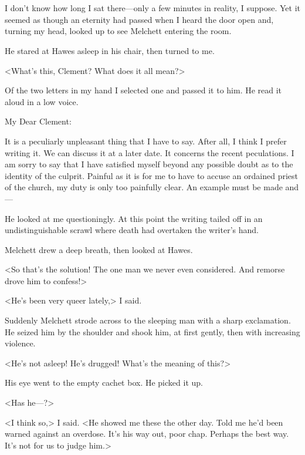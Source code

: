 \chapter[Chapter  \thechapter]{}


\lettrine{I}{} don't know how long I sat there—only a few minutes in reality, I suppose. Yet it seemed as though an eternity had passed when I heard the door open and, turning my head, looked up to see Melchett entering the room.

He stared at Hawes asleep in his chair, then turned to me.

<What's this, Clement? What does it all mean?>

Of the two letters in my hand I selected one and passed it to him. He read it aloud in a low voice.

\begin{mail}{}{My Dear Clement:}

It is a peculiarly unpleasant thing that I have to say. After all, I think I prefer writing it. We can discuss it at a later date. It concerns the recent peculations. I am sorry to say that I have satisfied myself beyond any possible doubt as to the identity of the culprit. Painful as it is for me to have to accuse an ordained priest of the church, my duty is only too painfully clear. An example must be made and—
\end{mail}

He looked at me questioningly. At this point the writing tailed off in an undistinguishable scrawl where death had overtaken the writer's hand.

Melchett drew a deep breath, then looked at Hawes.

<So that's the solution! The one man we never even considered. And remorse drove him to confess!>

<He's been very queer lately,> I said.

Suddenly Melchett strode across to the sleeping man with a sharp exclamation. He seized him by the shoulder and shook him, at first gently, then with increasing violence.

<He's not asleep! He's drugged! What's the meaning of this?>

His eye went to the empty cachet box. He picked it up.

<Has he—?>

<I think so,> I said. <He showed me these the other day. Told me he'd been warned against an overdose. It's his way out, poor chap. Perhaps the best way. It's not for us to judge him.>

